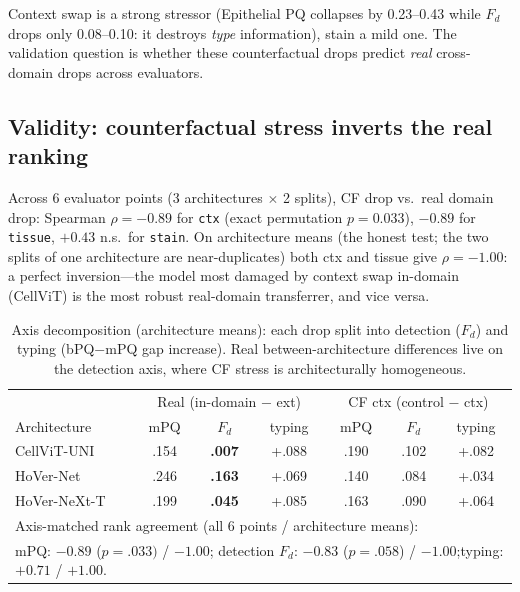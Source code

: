 \documentclass[11pt]{article}
\begin{document}
Context swap is a strong stressor (Epithelial PQ collapses by 0.23--0.43 while $F_d$ drops only
0.08--0.10: it destroys \emph{type} information), stain a mild one. The validation question is
whether these counterfactual drops predict \emph{real} cross-domain drops across evaluators.

\subsection{Validity: counterfactual stress inverts the real ranking}
\label{sec:validity}

Across 6 evaluator points (3 architectures $\times$ 2 splits), CF drop vs.\ real domain drop:
Spearman $\rho=-0.89$ for \texttt{ctx} (exact permutation $p=0.033$), $-0.89$ for
\texttt{tissue}, $+0.43$ n.s.\ for \texttt{stain}. On architecture means (the honest test; the
two splits of one architecture are near-duplicates) both ctx and tissue give $\rho=-1.00$: a
perfect inversion---the model most damaged by context swap in-domain (CellViT) is the most
robust real-domain transferrer, and vice versa.

\begin{table}[t]
\centering\small
\caption{Axis decomposition (architecture means): each drop split into detection ($F_d$) and
typing (bPQ$-$mPQ gap increase). Real between-architecture differences live on the detection
axis, where CF stress is architecturally homogeneous.}
\label{tab:axes}
\begin{tabular}{lcc|cc|cc}
\toprule
& \multicolumn{3}{c|}{Real (in-domain $-$ ext)} & \multicolumn{3}{c}{CF ctx (control $-$ ctx)} \\
Architecture & mPQ & $F_d$ & typing & mPQ & $F_d$ & typing \\
\midrule
CellViT-UNI  & .154 & \textbf{.007} & +.088 & .190 & .102 & +.082 \\
HoVer-Net    & .246 & \textbf{.163} & +.069 & .140 & .084 & +.034 \\
HoVer-NeXt-T & .199 & \textbf{.045} & +.085 & .163 & .090 & +.064 \\
\midrule
\multicolumn{7}{l}{\footnotesize Axis-matched rank agreement (all 6 points / architecture means):}\\
\multicolumn{7}{l}{\footnotesize\quad mPQ: $-0.89$ ($p{=}.033)$ / $-1.00$;\quad
detection $F_d$: $-0.83$ ($p{=}.058$) / $-1.00$;\quad typing: $+0.71$ / $\mathbf{+1.00}$.}\\
\bottomrule
\end{tabular}
\end{table}
\end{document}
